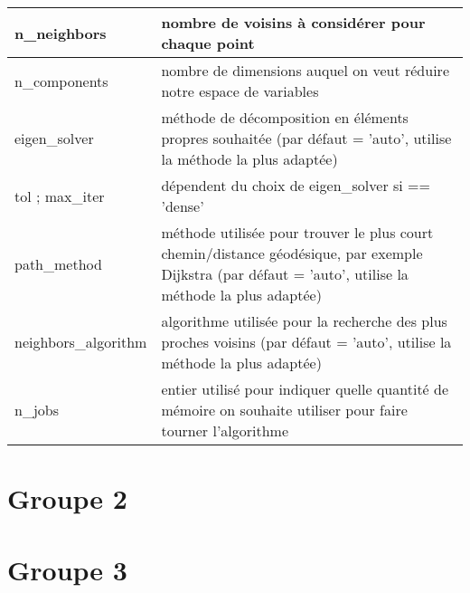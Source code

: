 \documentclass[12pt]{report}
\begin{document}
\begin{table}[!h]
\begin{tabular}{@{}|l|l|@{}}
\toprule
n\_neighbors         & nombre de voisins à considérer pour chaque point                                                                                                       \\ \midrule
n\_components        & nombre de dimensions auquel on veut réduire notre espace de variables                                                                                  \\ \midrule
eigen\_solver        & méthode de décomposition en éléments propres souhaitée (par défaut = 'auto',  utilise la méthode la plus adaptée)                                      \\ \midrule
tol ; max\_iter      & dépendent du choix de eigen\_solver si == 'dense'                                                                                                      \\ \midrule
path\_method         & méthode utilisée pour trouver le plus court chemin/distance géodésique, par exemple Dijkstra (par défaut = 'auto', utilise la méthode la plus adaptée) \\ \midrule
neighbors\_algorithm & algorithme utilisée pour la recherche des plus proches voisins (par défaut = 'auto', utilise la méthode la plus adaptée)                               \\ \midrule
n\_jobs              & entier utilisé pour indiquer quelle quantité de mémoire on souhaite utiliser pour faire tourner l'algorithme                                           \\ \bottomrule
\end{tabular}
\end{table}
\section{Groupe 2}

\section{Groupe 3}
\end{document}

